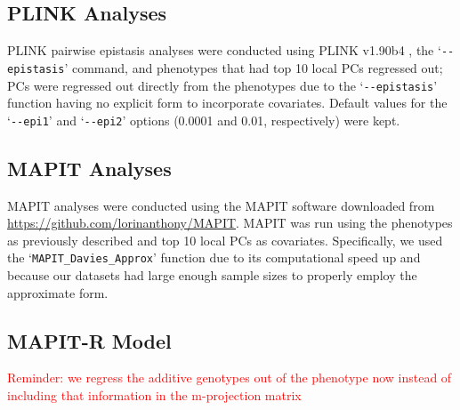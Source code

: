 \documentclass[12pt,a4paper]{article}
\begin{document}
\subsection{PLINK Analyses}

PLINK pairwise epistasis analyses were conducted using PLINK v1.90b4 \citep{Purcell2007}, the `\texttt{-{}-epistasis}' command, and phenotypes that had top 10 local PCs regressed out; PCs were regressed out directly from the phenotypes due to the `\texttt{-{}-epistasis}' function having no explicit form to incorporate covariates. Default values for the `\texttt{-{}-epi1}' and `\texttt{-{}-epi2}' options (0.0001 and 0.01, respectively) were kept.   

\subsection{MAPIT Analyses}

MAPIT analyses were conducted using the MAPIT software downloaded from \url{https://github.com/lorinanthony/MAPIT}. MAPIT was run using the phenotypes as previously described and top 10 local PCs as covariates. Specifically, we used the `\texttt{MAPIT\_Davies\_Approx}' function due to its computational speed up and because our datasets had large enough sample sizes to properly employ the approximate form.  






\subsection{MAPIT-R Model}

\textcolor{red}{Reminder: we regress the additive genotypes out of the phenotype now instead of including that information in the m-projection matrix}
\end{document}
